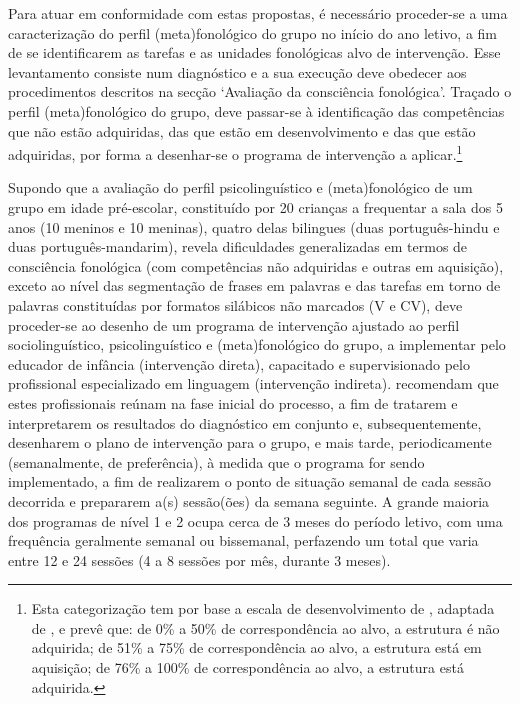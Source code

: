 \documentclass[output=paper,colorlinks,citecolor=brown,booklanguage=portuguese]{langscibook}
\begin{document}
Para atuar em conformidade com estas propostas, é necessário proceder-se a uma caracterização do perfil (meta)fonológico do grupo no início do ano letivo, a fim de se identificarem as tarefas e as unidades fonológicas alvo de intervenção. Esse levantamento consiste num diagnóstico e a sua execução deve obedecer aos procedimentos descritos na secção ‘Avaliação da consciência fonológica’. Traçado o perfil (meta)fonológico do grupo, deve passar-se à identificação das competências que não estão adquiridas, das que estão em desenvolvimento e das que estão adquiridas, por forma a desenhar-se o programa de intervenção a aplicar.\footnote{Esta\label{not:cap10not4} categorização tem por base a escala de desenvolvimento de \citet{LazzarottoVolcao2014}, adaptada de \citet{Yavas1991}, e prevê que: de 0\% a 50\% de correspondência ao alvo, a estrutura é não adquirida; de 51\% a 75\% de correspondência ao alvo, a estrutura está em aquisição; de 76\% a 100\% de correspondência ao alvo, a estrutura está adquirida.}

Supondo que a avaliação do perfil psicolinguístico e (meta)fonológico de um grupo em idade pré-escolar, constituído por 20 crianças a frequentar a sala dos 5 anos (10 meninos e 10 meninas), quatro delas bilingues (duas português-hindu e duas português-mandarim), revela dificuldades generalizadas em termos de consciência fonológica (com competências não adquiridas e outras em aquisição), exceto ao nível das segmentação de frases em palavras e das tarefas em torno de palavras constituídas por formatos silábicos não marcados (V e CV), deve proce\-der-se ao desenho de um programa de intervenção ajustado ao perfil sociolinguístico, psicolinguístico e (meta)fonológico do grupo, a implementar pelo educador de infância (intervenção direta), capacitado e supervisionado pelo profissional especializado em linguagem (intervenção indireta). \citet{Ebbels2017} recomendam que estes profissionais reúnam na fase inicial do processo, a fim de tratarem e interpretarem os resultados do diagnóstico em conjunto e, subsequentemente, desenharem o plano de intervenção para o grupo, e mais tarde, periodicamente (semanalmente, de preferência), à medida que o programa for sendo implementado, a fim de realizarem o ponto de situação semanal de cada sessão decorrida e prepararem a(s) sessão(ões) da semana seguinte. A grande maioria dos programas de nível 1 e 2 ocupa cerca de 3 meses do período letivo, com uma frequência geralmente semanal ou bissemanal, perfazendo um total que varia entre 12 e 24 sessões (4 a 8 sessões por mês, durante 3 meses). 
\end{document}
